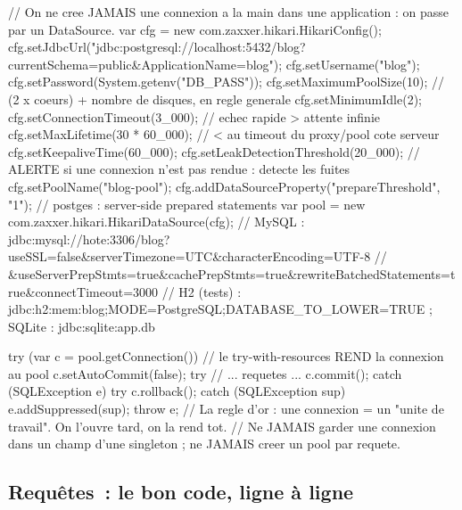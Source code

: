 \begin{codejava}
// On ne cree JAMAIS une connexion a la main dans une application : on passe par un DataSource.
var cfg = new com.zaxxer.hikari.HikariConfig();
cfg.setJdbcUrl("jdbc:postgresql://localhost:5432/blog?currentSchema=public&ApplicationName=blog");
cfg.setUsername("blog"); cfg.setPassword(System.getenv("DB_PASS"));
cfg.setMaximumPoolSize(10);            // (2 x coeurs) + nombre de disques, en regle generale
cfg.setMinimumIdle(2);
cfg.setConnectionTimeout(3_000);        // echec rapide > attente infinie
cfg.setMaxLifetime(30 * 60_000);         // < au timeout du proxy/pool cote serveur
cfg.setKeepaliveTime(60_000);
cfg.setLeakDetectionThreshold(20_000);   // ALERTE si une connexion n'est pas rendue : detecte les fuites
cfg.setPoolName("blog-pool");
cfg.addDataSourceProperty("prepareThreshold", "1");     // postges : server-side prepared statements
var pool = new com.zaxxer.hikari.HikariDataSource(cfg);
// MySQL : jdbc:mysql://hote:3306/blog?useSSL=false&serverTimezone=UTC&characterEncoding=UTF-8
//        &useServerPrepStmts=true&cachePrepStmts=true&rewriteBatchedStatements=true&connectTimeout=3000
// H2 (tests) : jdbc:h2:mem:blog;MODE=PostgreSQL;DATABASE_TO_LOWER=TRUE ; SQLite : jdbc:sqlite:app.db

try (var c = pool.getConnection()) {                 // le try-with-resources REND la connexion au pool
    c.setAutoCommit(false);
    try {
        // ... requetes ...
        c.commit();
    } catch (SQLException e) {
        try { c.rollback(); } catch (SQLException sup) { e.addSuppressed(sup); }
        throw e;
    }
}
// La regle d'or : une connexion = un "unite de travail". On l'ouvre tard, on la rend tot.
// Ne JAMAIS garder une connexion dans un champ d'une singleton ; ne JAMAIS creer un pool par requete.
\end{codejava}

\subsection{Requ\^etes~: le bon code, ligne \`a ligne}

